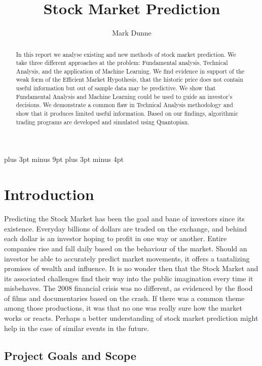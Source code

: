 \documentclass{report}
\title{Stock Market Prediction}
\author{Mark Dunne}
\begin{document}
\lstset{language=Python}    
\belowdisplayskip=12pt plus 3pt minus 9pt
\belowdisplayshortskip=7pt plus 3pt minus 4pt

\maketitle

\begin{abstract}

In this report we analyse existing and new methods of stock market prediction. We take three different approaches at the problem: Fundamental analysis, Technical Analysis, and the application of Machine Learning. We find evidence in support of the weak form of the Efficient Market Hypothesis, that the historic price does not contain useful information but out of sample data may be predictive. We show that Fundamental Analysis and Machine Learning could be used to guide an investor's decisions. We demonstrate a common flaw in Technical Analysis methodology and show that it produces limited useful information. Based on our findings, algorithmic trading programs are developed and simulated using Quantopian.

\end{abstract}

\tableofcontents

\chapter{Introduction}

Predicting the Stock Market has been the goal and bane of investors since its existence. Everyday billions of dollars are traded on the exchange, and behind each dollar is an investor hoping to profit in one way or another. Entire companies rise and fall daily based on the behaviour of the market. Should an investor be able to accurately predict market movements, it offers a tantalizing promises of wealth and influence. It is no wonder then that the Stock Market and its associated challenges find their way into the public imagination every time it misbehaves. The 2008 financial crisis was no different, as evidenced by the flood of films and documentaries based on the crash. If there was a common theme among those productions, it was that no one was really sure how the market works or reacts. Perhaps a better understanding of stock market prediction might help in the case of similar events in the future.

\section{Project Goals and Scope}
\end{document}
